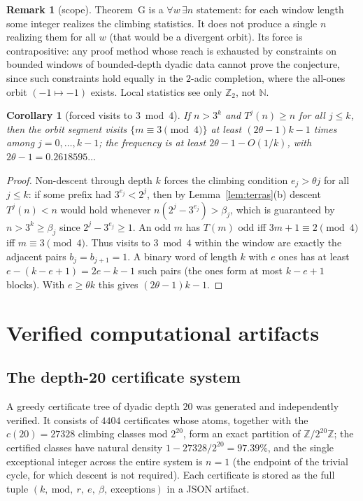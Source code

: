 \documentclass[11pt]{article}
\newtheorem{corollary}[theorem]{Corollary}
\theoremstyle{definition}
\newtheorem{remark}[theorem]{Remark}
\newcommand{\N}{\mathbb{N}}
\newcommand{\Z}{\mathbb{Z}}
\begin{document}
\begin{remark}[scope]\label{rem:scopeG}
Theorem~G is a $\forall w\,\exists n$ statement: for each window length
some integer realizes the climbing statistics. It does not produce a single
$n$ realizing them for all $w$ (that would be a divergent orbit). Its force
is contrapositive: any proof method whose reach is exhausted by constraints
on bounded windows of bounded-depth dyadic data cannot prove the
conjecture, since such constraints hold equally in the $2$-adic completion,
where the all-ones orbit $(-1\mapsto -1)$ exists. Local statistics see only
$\Z_2$, not $\N$.
\end{remark}

\begin{corollary}[forced visits to $3 \bmod 4$]\label{cor:freq}
If $n>3^k$ and $T^j(n)\ge n$ for all $j\le k$, then the orbit segment
visits $\{m\equiv 3 \pmod 4\}$ at least $(2\theta-1)k-1$ times among
$j=0,\dots,k-1$; the frequency is at least
$2\theta-1-O(1/k)$, with $2\theta-1=0.2618595\ldots$
\end{corollary}

\begin{proof}
Non-descent through depth $k$ forces the climbing condition $e_j>\theta j$
for all $j\le k$: if some prefix had $3^{e_j}<2^j$, then by
Lemma~\ref{lem:terras}(b) descent $T^j(n)<n$ would hold whenever
$n(2^j-3^{e_j})>\beta_j$, which is guaranteed by $n>3^k\ge\beta_j$
since $2^j-3^{e_j}\ge 1$. An odd $m$
has $T(m)$ odd iff $3m+1\equiv 2\pmod 4$ iff $m\equiv 3\pmod 4$. Thus
visits to $3\bmod 4$ within the window are exactly the adjacent pairs
$b_j=b_{j+1}=1$. A binary word of length $k$ with $e$ ones has at least
$e-(k-e+1)=2e-k-1$ such pairs (the ones form at most $k-e+1$ blocks). With
$e\ge\theta k$ this gives $(2\theta-1)k-1$.
\end{proof}

\section{Verified computational artifacts}\label{sec:artifacts}

\subsection{The depth-20 certificate system}
A greedy certificate tree of dyadic depth $20$ was generated and
independently verified. It consists of $4404$ certificates whose atoms,
together with the $c(20)=27328$ climbing classes mod $2^{20}$, form an
exact partition of $\Z/2^{20}\Z$; the certified classes have natural
density $1-27328/2^{20}=97.39\%$, and the single exceptional integer across
the entire system is $n=1$ (the endpoint of the trivial cycle, for which
descent is not required). Each certificate is stored as the full tuple
$(k,\ \mathrm{mod},\ r,\ e,\ \beta,\ \text{exceptions})$ in a JSON artifact.
\end{document}
